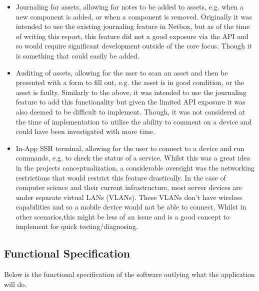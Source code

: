 \documentclass [11pt,a4paper]{article}
\begin{document}
\begin{itemize}
\item Journaling for assets, allowing for notes to be added to assets, e.g. when a new component is added, or when a component is removed.
\subitem Originally it was intended to use the existing journaling feature in Netbox, but as of the time of writing this report, this feature did not a good exposure via the API and so would require significant development outside of the core focus. Though it is something that could easily be added.

\item Auditing of assets, allowing for the user to scan an asset and then be presented with a form to fill out, e.g. the asset is in good condition, or the asset is faulty. 
\subitem Similarly to the above, it was intended to use the journaling feature to add this functionality but given the limited API exposure it was also deemed to be difficult to implement. Though, it was not considered at the time of implementation to utilise the ability to comment on a device and could have been investigated with more time. 

\item In-App SSH terminal, allowing for the user to connect to a device and run commands, e.g. to check the status of a service. 
\subitem Whilst this was a great idea in the projects conceptualization, a considerable oversight was the networking restrictions that would restrict this feature drastically. In the case of computer science and their current infrastructure, most server devices are under separate virtual LANs (VLANs). These VLANs don't have wireless capabilities and so a mobile device would not be able to connect. Whilst in other scenarios,this might be less of an issue and is a good concept to implement for quick testing/diagnosing. 
\end{itemize}


\subsection{Functional Specification}
\label{sec:func_spec}
Below is the functional specification of the software outlying what the application will do.
\end{document}
